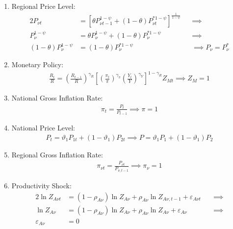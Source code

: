 \documentclass[
thesis.tex
]{subfiles}
\begin{document}
\begin{enumerate}
	\item Regional Price Level:
	\begin{alignat}{2}
		\label{eq:reg-ss-general-price-level}
		P_{\nu t} &= \left[ \theta P_{\nu t-1}^{1-\psi} + (1-\theta) P_{\nu t}^{\ast 1-\psi} \right]^\frac{1}{1-\psi} &&\implies \nonumber \\
		P_{\nu}^{1-\psi} &= \theta P_{\nu}^{1-\psi} + (1-\theta) P_{\nu}^{\ast 1-\psi} &&\implies \nonumber \\ 
		(1-\theta) P_{\nu}^{1-\psi} &= (1-\theta) P_{\nu}^{\ast 1-\psi} &&\implies P_{\nu} = P_{\nu}^\ast
	\end{alignat}

	\item Monetary Policy:
	\begin{align}
		\label{eq:reg-ss-monetary-policy}
		\frac{R_{t}}{R} =
		\left( \frac{R_{t-1}}{R} \right)^{\gamma_R}  \left[
		\left( \frac{\pi_t}{\pi} \right)^{\gamma_\pi}
		\left( \frac{Y_t}{Y} \right)^{\gamma_Y} \right]^{1-\gamma_R} Z_{Mt}
		\implies Z_{M} = 1
	\end{align}

	\item National Gross Inflation Rate:
	\begin{align}
		\pi_t = \frac{P_t}{P_{t-1}} \implies \pi = 1 \label{eq:reg-ss-gross-inflation-rate}
	\end{align}
	
	\item National Price Level:
	\begin{align}
		P_t = \vartheta_1 P_{1 t} + (1 -\vartheta_1) P_{2 t} \implies P = \vartheta_1 P_{1} + (1 -\vartheta_1) P_{2} \label{eq:ss-national-price-level}
	\end{align}
	
	\item Regional Gross Inflation Rate:
	\begin{align}
		\pi_{\nu t} = \frac{P_{\nu t}}{P_{\nu, t-1}} \implies \pi_{\nu} = 1 \label{eq:ss-regional-inflation}
	\end{align}

	\item Productivity Shock:
	\begin{alignat}{2}
		\ln{Z_{A\nu t}} &= (1 -\rho_{A\nu}) \ln{Z_{A\nu}} + \rho_{A\nu} \ln{Z_{A\nu,t-1}} + \varepsilon_{A\nu t} \quad &\implies \nonumber \\
		\ln{Z_{A\nu}} &= (1 -\rho_{A\nu}) \ln{Z_{A\nu}} + \rho_{A\nu} \ln{Z_{A\nu}} + \varepsilon_{A\nu} &\implies \nonumber \\
		\varepsilon_{A\nu} &= 0 \label{eq:reg-ss-productivity-shock}
	\end{alignat}
	

\end{enumerate}
\end{document}
